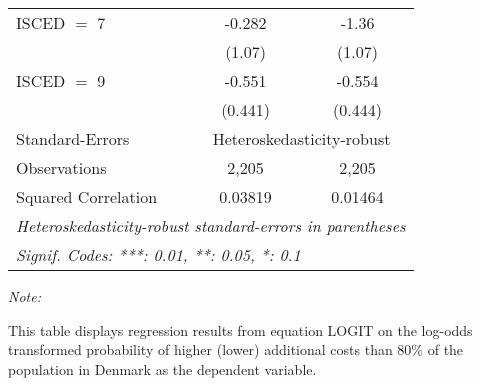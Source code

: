 \begin{table}[htbp!]
\begin{adjustbox}{width = 1\textwidth, max height = 0.95\textheight, center}
\begin{threeparttable}[b]
\begin{tabular}{lcc}
            ISCED $=$ 7          & -0.282         & -1.36\\   
                                 & (1.07)         & (1.07)\\   
            ISCED $=$ 9          & -0.551         & -0.554\\   
                                 & (0.441)        & (0.444)\\   
            \midrule 
            Standard-Errors & \multicolumn{2}{c}{Heteroskedasticity-robust} \\ 
            Observations         & 2,205          & 2,205\\  
            Squared Correlation  & 0.03819        & 0.01464\\  
            \midrule \midrule
            \multicolumn{3}{l}{\emph{Heteroskedasticity-robust standard-errors in parentheses}}\\
            \multicolumn{3}{l}{\emph{Signif. Codes: ***: 0.01, **: 0.05, *: 0.1}}\\
         \end{tabular}
         
         \begin{tablenotes}\item \medskip \textit{Note:}
            \item This table displays regression results from equation LOGIT on the log-odds transformed probability of higher (lower) additional costs than 80\% of the population in Denmark as the dependent variable. 
         \end{tablenotes}
      \end{threeparttable}
   \end{adjustbox}
\end{table}



